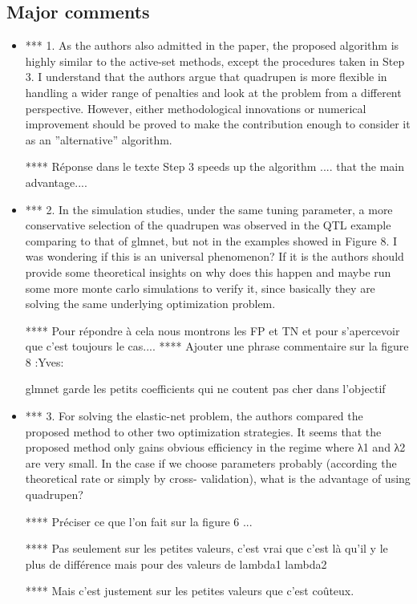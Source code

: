 \documentclass[a4paper,11pt]{texMemo}
\begin{document}
\subsection*{Major comments}
\begin{itemize}
\item
  *** 1. As the authors also admitted in the paper, the proposed algorithm is highly similar
to the active-set methods, except the procedures taken in Step 3. I understand
that the authors argue that quadrupen is more flexible in handling a wider range
of penalties and look at the problem from a different perspective. However, either
methodological innovations or numerical improvement should be proved to make the
contribution enough to consider it as an ”alternative” algorithm.

**** Réponse dans le texte 
Step 3 speeds up the algorithm .... that the main advantage....



\item 
*** 2. In the simulation studies, under the same tuning parameter, a more conservative
selection of the quadrupen was observed in the QTL example comparing to that of
glmnet, but not in the examples showed in Figure 8. I was wondering if this is an
universal phenomenon? If it is the authors should provide some theoretical insights
on why does this happen and maybe run some more monte carlo simulations to verify
it, since basically they are solving the same underlying optimization problem.

**** Pour répondre à cela nous montrons les FP et TN et pour s'apercevoir que c'est toujours le cas....
**** Ajouter une phrase commentaire sur la figure 8   :Yves:

glmnet garde les petits coefficients qui ne coutent pas cher dans l'objectif

\item 
*** 3. For solving the elastic-net problem, the authors compared the proposed method to
other two optimization strategies. It seems that the proposed method only gains
obvious efficiency in the regime where λ1 and λ2 are very small. In the case if
we choose parameters probably (according the theoretical rate or simply by cross-
validation), what is the advantage of using quadrupen?

**** Préciser ce que l'on fait sur la figure 6 ... 

**** Pas seulement sur les petites valeurs,
c'est vrai que c'est là qu'il y
le plus de différence mais pour
des valeurs de lambda1 lambda2


**** Mais c'est justement 
sur les petites valeurs que c'est coûteux.
\end{itemize}
\end{document}
